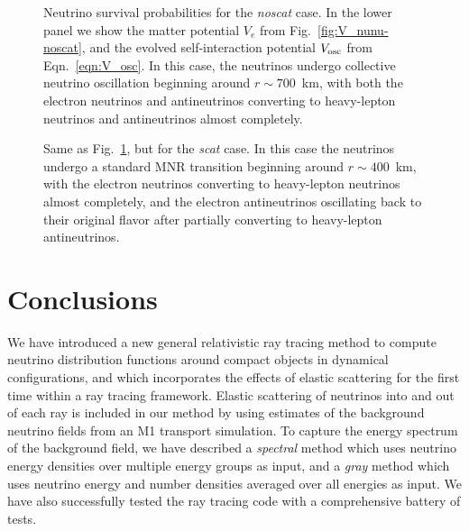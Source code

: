 \documentclass[aps,floatfix,prd,superscriptaddress,twocolumn]{revtex4-1}
\begin{document}
\begin{figure}
  \resizebox{\columnwidth}{!}{}
  \caption{Neutrino survival probabilities for the \emph{noscat} case.
    In the lower panel we show the matter potential $V_e$ from
    Fig.~\ref{fig:V_nunu-noscat},
    and the evolved self-interaction potential $V_{\rm osc}$ from
    Eqn.~\ref{eqn:V_osc}.
    In this case, the neutrinos undergo collective neutrino oscillation
    beginning around $r\sim700$~km,
    with both the electron neutrinos and antineutrinos converting to
    heavy-lepton neutrinos and antineutrinos almost completely.
  }
  \label{fig:survival-noscat}
\end{figure}

\begin{figure}
  \resizebox{\columnwidth}{!}{}
  \caption{Same as Fig.~\ref{fig:survival-noscat},
    but for the \emph{scat} case.
    In this case the neutrinos undergo a standard MNR transition
    beginning around $r\sim400$~km,
    with the electron neutrinos converting to heavy-lepton neutrinos almost
    completely,
    and the electron antineutrinos oscillating back to their original flavor
    after partially converting to heavy-lepton antineutrinos.
  }
  \label{fig:survival-scat}
\end{figure}

\section{Conclusions}
\label{sec:conclusions}
We have introduced a new general relativistic ray tracing method to compute
neutrino distribution functions around compact objects in dynamical configurations,
and which incorporates the effects of elastic scattering for the first time
within a ray tracing framework.
Elastic scattering of neutrinos into and out of each ray is included in our
method by using estimates of the background neutrino fields from an
M1 transport simulation.
To capture the energy spectrum of the background field, we have described a
\emph{spectral} method which uses neutrino energy densities over multiple
energy groups as input, and a
\emph{gray} method which uses neutrino energy and number densities averaged
over all energies as input.
We have also successfully tested the ray tracing code with a comprehensive
battery of tests.
\end{document}
